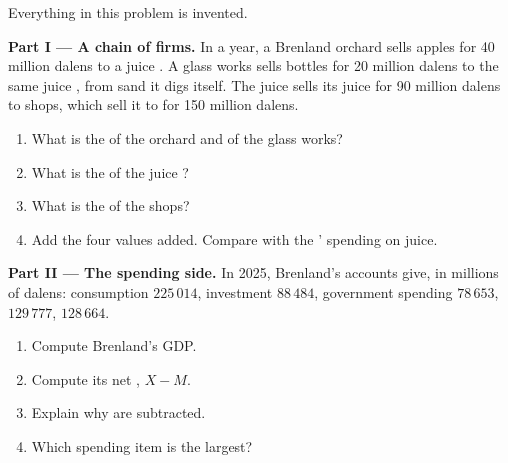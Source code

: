 \begin{problem}
\label{pb:g8:gdp:1}
Everything in this problem is invented.

\medskip
\noindent\textbf{Part I --- A chain of firms.} In a year, a Brenland orchard sells apples for 40
million dalens to a juice . A glass works sells bottles for 20 million dalens to the same juice
, from sand it digs itself. The juice  sells its juice for 90 million dalens to shops,
which sell it to  for 150 million dalens.
\begin{enumerate}
  \item What is the  of the orchard and of the glass works?
  \item What is the  of the juice ?
  \item What is the  of the shops?
  \item Add the four values added. Compare with the ' spending on juice.
\end{enumerate}

\medskip
\noindent\textbf{Part II --- The spending side.} In 2025, Brenland's accounts give, in millions of
dalens: consumption $225\,014$, investment $88\,484$, government spending $78\,653$, 
$129\,777$,  $128\,664$.
\begin{enumerate}[resume]
  \item Compute Brenland's GDP.
  \item Compute its net , $X - M$.
  \item Explain why  are subtracted.
  \item Which spending item is the largest?
\end{enumerate}


\end{problem}

